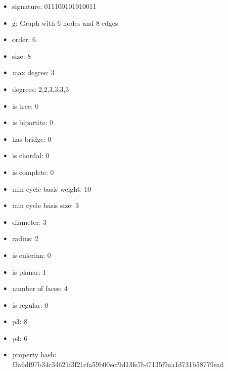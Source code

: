 \begin{itemize}
\item signature: 011100101010011
\item g: Graph with 6 nodes and 8 edges
\item order: 6
\item size: 8
\item max degree: 3
\item degrees: 2,2,3,3,3,3
\item is tree: 0
\item is bipartite: 0
\item has bridge: 0
\item is chordal: 0
\item is complete: 0
\item min cycle basis weight: 10
\item min cycle basis size: 3
\item diameter: 3
\item radius: 2
\item is eulerian: 0
\item is planar: 1
\item number of faces: 4
\item is regular: 0
\item p3: 8
\item p4: 6
\item property hash: f3a6df97b34c34621f3f21cfa59b00ecf9d13fe7b47135f9aa1d731b58779ead
\end{itemize}
\newpage
\begin{figure}
\end{figure}

